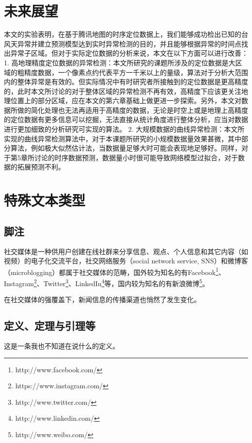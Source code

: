 \documentclass[a4paper,AutoFakeBold,oneside,12pt]{book}
\begin{document}
{{\section{未来展望}
本文的实验表明，在基于腾讯地图的时序定位数据上，我们能够成功检出已知的台风天异常并建立预测模型达到实时异常检测的目的，并且能够根据异常的时间点找出异常子区域。但对于实际定位数据的分析来说，本文在以下方面可以进行改善：
	1. 高地理精度定位数据的异常检测：本文所研究的课题所涉及的定位数据是大区域的粗精度数据，一个像素点约代表平方一千米以上的量级，算法对于分析大范围内的整体异常是有效的。但实际情况中有时研究者所接触到的定位数据是更高精度的，此时本文所讨论的对于整体区域的异常检测不再有效，高精度下应该更关注地理位置上的部分区域，应在本文的第六章基础上做更进一步探索。另外，本文对数据所做的简化处理也无法再适用于高精度的数据，无论是时空上或是地理上高精度的定位数据有更多信息可以挖掘，无法直接从统计角度进行整体分析，应当对数据进行更加细致的分析研究可实现的算法。
	2. 大规模数据的曲线异常检测：本文所实现的曲线异常检测算法中，对于本课题所研究的小规模数据量效果甚微，其中部分算法，例如极大似然估计法，当数据量足够大时可能会表现地足够好。同样，对于第5章所讨论的时序数据预测，数据量小时很可能导致网络模型过拟合，对于数据的拓展预测不利。


\section{特殊文本类型}
\subsection{脚注}
社交媒体是一种供用户创建在线社群来分享信息、观点、个人信息和其它内容（如视频）的电子化交流平台，社交网络服务（social network service, SNS）和微博客（microblogging）都属于社交媒体的范畴\cite{webster_social_media}，国外较为知名的有Facebook\footnote{http://www.facebook.com/}、Instagram\footnote{https://www.instagram.com/}、Twitter\footnote{http://www.twitter.com/}、LinkedIn\footnote{http://www.linkedin.com/}等，国内较为知名的有新浪微博\footnote{http://www.weibo.com/}。

在社交媒体的强覆盖下，新闻信息的传播渠道也悄然了发生变化。\cite{false_news_spread_2018}

\subsection{定义、定理与引理等}
\begin{definition}
这是一条我也不知道在说什么的定义。\cite{周兴2017基于深度学习的谣言检测及模式挖掘}
\end{definition}

}}
\end{document}
